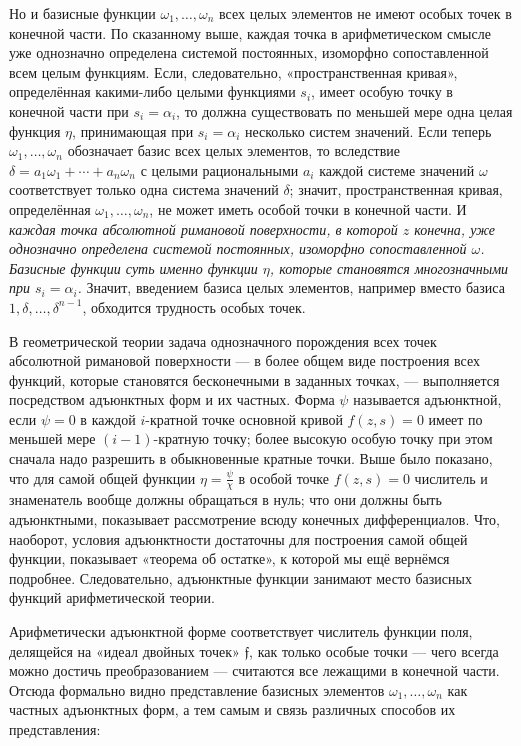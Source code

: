 \documentclass[11pt]{article}
\providecommand{\frf}{\mathfrak f}
\begin{document}
Но и базисные функции \(\omega_1,\ldots,\omega_n\) всех целых элементов не имеют особых точек в конечной части. По сказанному выше, каждая точка в арифметическом смысле уже однозначно определена системой постоянных, изоморфно сопоставленной всем целым функциям. Если, следовательно, «пространственная кривая», определённая какими-либо целыми функциями \(s_i\), имеет особую точку в конечной части при \(s_i=\alpha_i\), то должна существовать по меньшей мере одна целая функция \(\eta\), принимающая при \(s_i=\alpha_i\) несколько систем значений. Если теперь \(\omega_1,\ldots,\omega_n\) обозначает базис всех целых элементов, то вследствие \(\delta=a_1\omega_1+\cdots+a_n\omega_n\) с целыми рациональными \(a_i\) каждой системе значений \(\omega\) соответствует только одна система значений \(\delta\); значит, пространственная кривая, определённая \(\omega_1,\ldots,\omega_n\), не может иметь особой точки в конечной части. И \emph{каждая точка абсолютной римановой поверхности, в которой \(z\) конечна, уже однозначно определена системой постоянных, изоморфно сопоставленной \(\omega\). Базисные функции суть именно функции \(\eta\), которые становятся многозначными при \(s_i=\alpha_i\).} Значит, введением базиса целых элементов, например вместо базиса \(1,\delta,\ldots,\delta^{n-1}\), обходится трудность особых точек.

В геометрической теории задача однозначного порождения всех точек абсолютной римановой поверхности --- в более общем виде построения всех функций, которые становятся бесконечными в заданных точках, --- выполняется посредством адъюнктных форм и их частных. Форма \(\psi\) называется адъюнктной, если \(\psi=0\) в каждой \(i\)-кратной точке основной кривой \(f(z,s)=0\) имеет по меньшей мере \((i-1)\)-кратную точку; более высокую особую точку при этом сначала надо разрешить в обыкновенные кратные точки. Выше было показано, что для самой общей функции \(\eta=\frac{\psi}{\chi}\) в особой точке \(f(z,s)=0\) числитель и знаменатель вообще должны обращаться в нуль; что они должны быть адъюнктными, показывает рассмотрение всюду конечных дифференциалов. Что, наоборот, условия адъюнктности достаточны для построения самой общей функции, показывает «теорема об остатке», к которой мы ещё вернёмся подробнее. Следовательно, адъюнктные функции занимают место базисных функций арифметической теории.

Арифметически адъюнктной форме соответствует числитель функции поля, делящейся на «идеал двойных точек» \(\frf\), как только особые точки --- чего всегда можно достичь преобразованием --- считаются все лежащими в конечной части. Отсюда формально видно представление базисных элементов \(\omega_1,\ldots,\omega_n\) как частных адъюнктных форм, а тем самым и связь различных способов их представления:
\end{document}
